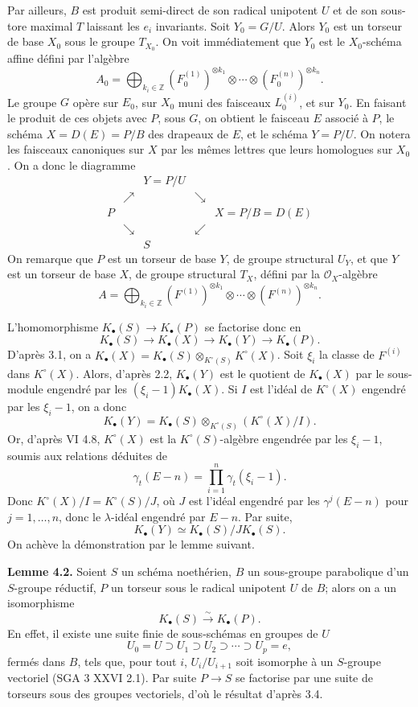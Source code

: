 \documentclass[11pt]{article}
\begin{document}
Par ailleurs, $B$ est produit semi-direct de son radical unipotent $U$ et de son sous-tore maximal $T$ laissant les $e_i$ invariants. Soit $Y_0=G/U$. Alors $Y_0$ est un torseur de base $X_0$ sous le groupe $T_{X_0}$. On voit immédiatement que $Y_0$ est le $X_0$-schéma affine défini par l'algèbre
\[
A_0=\bigoplus_{k_i\in\mathbb Z}(F_0^{(1)})^{\otimes k_1}\otimes\cdots\otimes(F_0^{(n)})^{\otimes k_n}.
\]
Le groupe $G$ opère sur $E_0$, sur $X_0$ muni des faisceaux $L_0^{(i)}$, et sur $Y_0$. En faisant le produit de ces objets avec $P$, sous $G$, on obtient le faisceau $E$ associé à $P$, le schéma $X=D(E)=P/B$ des drapeaux de $E$, et le schéma $Y=P/U$. On notera les faisceaux canoniques sur $X$ par les mêmes lettres que leurs homologues sur $X_0$. On a donc le diagramme
\[
\begin{array}{ccccc}
&& Y=P/U &&\\[-0.2em]
& \nearrow && \searrow &\\[-0.2em]
P &&&& X=P/B=D(E)\\[-0.2em]
& \searrow && \swarrow &\\[-0.2em]
&& S &&
\end{array}
\]
On remarque que $P$ est un torseur de base $Y$, de groupe structural $U_Y$, et que $Y$ est un torseur de base $X$, de groupe structural $T_X$, défini par la $\mathcal O_X$-algèbre
\[
A=\bigoplus_{k_i\in\mathbb Z}(F^{(1)})^{\otimes k_1}\otimes\cdots\otimes(F^{(n)})^{\otimes k_n}.
\]

L'homomorphisme $K_\bullet(S)\to K_\bullet(P)$ se factorise donc en
\[
K_\bullet(S)\longrightarrow K_\bullet(X)\longrightarrow K_\bullet(Y)\longrightarrow K_\bullet(P).
\]
D'après 3.1, on a $K_\bullet(X)=K_\bullet(S)\otimes_{K^\circ(S)}K^\circ(X)$. Soit $\xi_i$ la classe de $F^{(i)}$ dans $K^\circ(X)$. Alors, d'après 2.2, $K_\bullet(Y)$ est le quotient de $K_\bullet(X)$ par le sous-module engendré par les $(\xi_i-1)K_\bullet(X)$. Si $I$ est l'idéal de $K^\circ(X)$ engendré par les $\xi_i-1$, on a donc
\[
K_\bullet(Y)=K_\bullet(S)\otimes_{K^\circ(S)}(K^\circ(X)/I).
\]
Or, d'après VI 4.8, $K^\circ(X)$ est la $K^\circ(S)$-algèbre engendrée par les $\xi_i-1$, soumis aux relations déduites de
\[
\gamma_t(E-n)=\prod_{i=1}^n\gamma_t(\xi_i-1).
\]
Donc $K^\circ(X)/I=K^\circ(S)/J$, où $J$ est l'idéal engendré par les $\gamma^j(E-n)$ pour $j=1,\ldots,n$, donc le $\lambda$-idéal engendré par $E-n$. Par suite,
\[
K_\bullet(Y)\simeq K_\bullet(S)/J K_\bullet(S).
\]
On achève la démonstration par le lemme suivant.

\textbf{Lemme 4.2.} Soient $S$ un schéma noethérien, $B$ un sous-groupe parabolique d'un $S$-groupe réductif, $P$ un torseur sous le radical unipotent $U$ de $B$; alors on a un isomorphisme
\[
K_\bullet(S)\xrightarrow{\sim}K_\bullet(P).
\]
En effet, il existe une suite finie de sous-schémas en groupes de $U$
\[
U_0=U\supset U_1\supset U_2\supset\cdots\supset U_p=e,
\]
fermés dans $B$, tels que, pour tout $i$, $U_i/U_{i+1}$ soit isomorphe à un $S$-groupe vectoriel (SGA 3 XXVI 2.1). Par suite $P\to S$ se factorise par une suite de torseurs sous des groupes vectoriels, d'où le résultat d'après 3.4.
\end{document}

